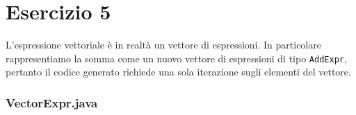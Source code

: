 \section*{Esercizio 5}

L'espressione vettoriale è in realtà un vettore di espressioni. In particolare
rappresentiamo la somma come un nuovo vettore di espressioni di tipo
\texttt{AddExpr}, pertanto il codice generato richiede una sola iterazione
sugli elementi del vettore.

\subsubsection*{VectorExpr.java}
\inputminted{java}{tex/src/5/VectorExpr.java}
